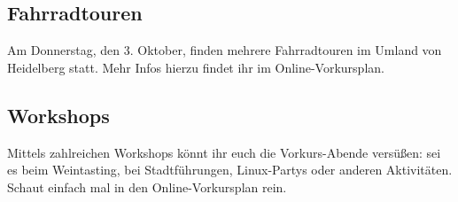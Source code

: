 \subsection{Fahrradtouren}
Am Donnerstag, den 3. Oktober, finden mehrere Fahrradtouren im Umland von Heidelberg statt. Mehr Infos hierzu findet ihr im Online-Vorkursplan.

\subsection{Workshops}
Mittels zahlreichen Workshops könnt ihr euch die Vorkurs-Abende versüßen: sei es beim Weintasting, bei Stadtführungen, Linux-Partys oder anderen Aktivitäten. Schaut einfach mal in den Online-Vorkursplan rein.
